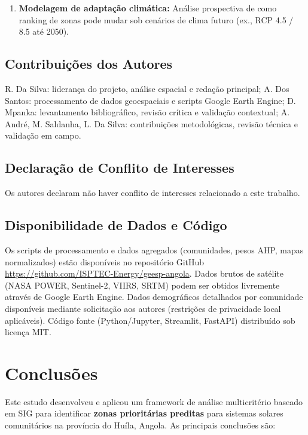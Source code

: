 \documentclass[12pt, a4paper]{article}
\begin{document}
{{{{{{{{{{{{\begin{enumerate}
\item \textbf{Modelagem de adaptação climática:} Análise prospectiva de como ranking de zonas pode mudar sob cenários de clima futuro (ex., RCP 4.5 / 8.5 até 2050).

\end{enumerate}


\subsection*{Contribuições dos Autores}
\label{sec:author-contributions}
R. Da Silva: liderança do projeto, análise espacial e redação principal; A. Dos Santos: processamento de dados geoespaciais e scripts Google Earth Engine; D. Mpanka: levantamento bibliográfico, revisão crítica e validação contextual; A. André, M. Saldanha, L. Da Silva: contribuições metodológicas, revisão técnica e validação em campo.

\subsection*{Declaração de Conflito de Interesses}
\label{sec:conflicts}
Os autores declaram não haver conflito de interesses relacionado a este trabalho.

\subsection*{Disponibilidade de Dados e Código}
\label{sec:data-availability}
Os scripts de processamento e dados agregados (comunidades, pesos AHP, mapas normalizados) estão disponíveis no repositório GitHub \url{https://github.com/ISPTEC-Energy/geesp-angola}. Dados brutos de satélite (NASA POWER, Sentinel-2, VIIRS, SRTM) podem ser obtidos livremente através de Google Earth Engine. Dados demográficos detalhados por comunidade disponíveis mediante solicitação aos autores (restrições de privacidade local aplicáveis). Código fonte (Python/Jupyter, Streamlit, FastAPI) distribuído sob licença MIT.

\section{Conclusões}

Este estudo desenvolveu e aplicou um framework de análise multicritério baseado em SIG para identificar \textbf{zonas prioritárias preditas} para sistemas solares comunitários na província do Huíla, Angola. As principais conclusões são:

}}}}}}}}}}}}
\end{document}
